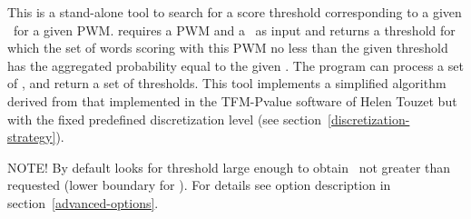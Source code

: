 This is a stand-alone tool to search for a score threshold corresponding to a given \pvalue\ for a given PWM.
 requires a PWM and a \pvalue\ as input and returns a threshold for which the set of
words scoring with this PWM no less than the given threshold has the aggregated probability equal to
the given \pvalue. The program can process a set of \pvalues, and return a set of thresholds.
This tool implements a simplified algorithm derived from that implemented in the TFM-Pvalue software of
Helen Touzet  but with the fixed predefined discretization level (see section~\ref{discretization-strategy}).

\usageheader
{}


NOTE! By default  looks for threshold large enough to obtain \pvalue\ not 
greater than requested (lower boundary for \pvalue). For details see  option description in section~\ref{advanced-options}.
